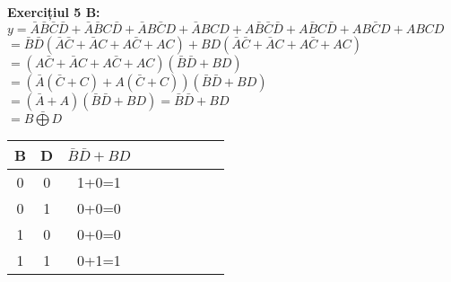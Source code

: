 \documentclass[12pt]{article}
\begin{document}
\begin{figure}[!h]
    \begin{minipage}{0.6\textwidth}
        \textbf{Exercițiul 5 B:\\}
        $y=\bar{A}\bar{B}\bar{C}\bar{D}+ \bar{A}\bar{B}C\bar{D}+\bar{A}B\bar{C}D+\bar{A}BCD+A\bar{B}\bar{C}\bar{D}+A\bar{B}C\bar{D}+AB\bar{C}D+ABCD$\\
        $ =\bar{B}\bar{D}(\bar{A}\bar{C}+\bar{A}C+A\bar{C}+AC)+BD(\bar{A}\bar{C}+\bar{A}C+A\bar{C}+AC)$\\
        $ =(A\bar{C}+\bar{A}C+A\bar{C}+AC)(\bar{B}\bar{D}+BD)$\\
        $ =(\bar{A}(\bar{C}+C)+A(\bar{C}+C))(\bar{B}\bar{D}+BD)$\\
        $ =(\bar{A}+A)(\bar{B}\bar{D}+BD)=\bar{B}\bar{D}+BD$\\
        $ =\bar{B\bigoplus D}$\\
    \end{minipage}
    \hfill
    \begin{minipage}{0.4\textwidth}
        \begin{tabular}{|c|c|c|c|c|c|c|c|c|}
            \hline
            B & D & $\bar{B}\bar{D}+BD$ \\ \hline
            0 & 0 &  1+0=1\\ \hline
            0 & 1 &  0+0=0\\ \hline
            1 & 0 &  0+0=0\\ \hline
            1 & 1 &  0+1=1\\ \hline
        \end{tabular}
    \end{minipage}
\end{figure}
\end{document}
